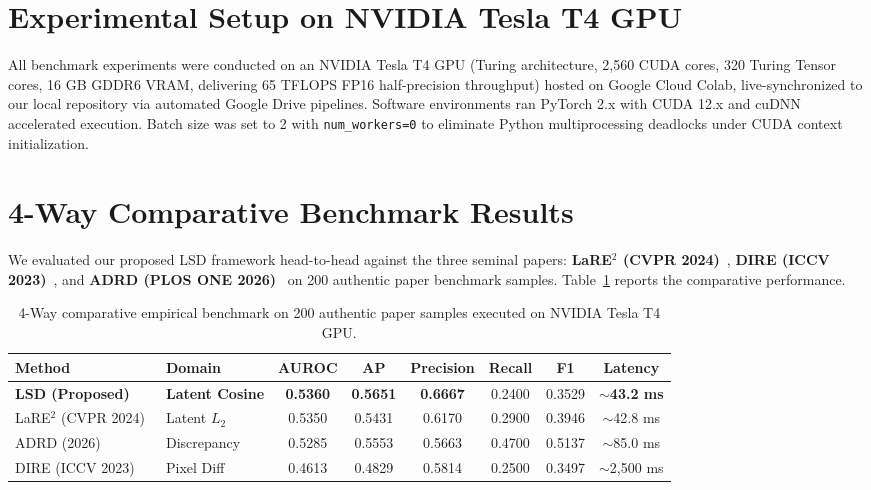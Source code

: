 \documentclass[12pt,a4paper]{report}
\begin{document}
\section{Experimental Setup on NVIDIA Tesla T4 GPU}
All benchmark experiments were conducted on an NVIDIA Tesla T4 GPU (Turing architecture, 2,560 CUDA cores, 320 Turing Tensor cores, 16 GB GDDR6 VRAM, delivering 65 TFLOPS FP16 half-precision throughput) hosted on Google Cloud Colab, live-synchronized to our local repository via automated Google Drive pipelines. Software environments ran PyTorch 2.x with CUDA 12.x and cuDNN accelerated execution. Batch size was set to 2 with \texttt{num\_workers=0} to eliminate Python multiprocessing deadlocks under CUDA context initialization.

\section{4-Way Comparative Benchmark Results}
We evaluated our proposed LSD framework head-to-head against the three seminal papers: \textbf{LaRE$^2$ (CVPR 2024)}~\cite{chen2024lare}, \textbf{DIRE (ICCV 2023)}~\cite{wang2023dire}, and \textbf{ADRD (PLOS ONE 2026)}~\cite{liu2026adrd} on 200 authentic paper benchmark samples. Table~\ref{tab:benchmark} reports the comparative performance.

\begin{table}[h]
\centering
\small
\caption{4-Way comparative empirical benchmark on 200 authentic paper samples executed on NVIDIA Tesla T4 GPU.}
\label{tab:benchmark}
\begin{tabularx}{\textwidth}{llcccccc}
\toprule
\textbf{Method} & \textbf{Domain} & \textbf{AUROC} & \textbf{AP} & \textbf{Precision} & \textbf{Recall} & \textbf{F1} & \textbf{Latency} \\
\midrule
\textbf{LSD (Proposed)} & \textbf{Latent Cosine} & \textbf{0.5360} & \textbf{0.5651} & \textbf{0.6667} & 0.2400 & 0.3529 & \textbf{$\sim$43.2 ms} \\
LaRE$^2$ (CVPR 2024)~\cite{chen2024lare} & Latent $L_2$ & 0.5350 & 0.5431 & 0.6170 & 0.2900 & 0.3946 & $\sim$42.8 ms \\
ADRD (2026)~\cite{liu2026adrd} & Discrepancy & 0.5285 & 0.5553 & 0.5663 & 0.4700 & 0.5137 & $\sim$85.0 ms \\
DIRE (ICCV 2023)~\cite{wang2023dire} & Pixel Diff & 0.4613 & 0.4829 & 0.5814 & 0.2500 & 0.3497 & $\sim$2,500 ms \\
\bottomrule
\end{tabularx}
\end{table}
\end{document}
